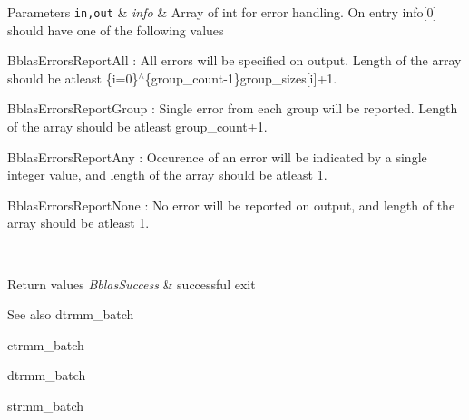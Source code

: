 \begin{DoxyParams}[1]{Parameters}
\hline
\mbox{\tt in,out}  & {\em info} & Array of int for error handling. On entry info\mbox{[}0\mbox{]} should have one of the following values
\begin{DoxyItemize}
\item Bblas\+Errors\+Report\+All \+: All errors will be specified on output. Length of the array should be atleast \{i=0\}$^\wedge$\{group\+\_\+count-\/1\}group\+\_\+sizes\mbox{[}i\mbox{]}+1.
\item Bblas\+Errors\+Report\+Group \+: Single error from each group will be reported. Length of the array should be atleast group\+\_\+count+1.
\item Bblas\+Errors\+Report\+Any \+: Occurence of an error will be indicated by a single integer value, and length of the array should be atleast 1.
\item Bblas\+Errors\+Report\+None \+: No error will be reported on output, and length of the array should be atleast 1.
\end{DoxyItemize}\\
\hline
\end{DoxyParams}

\begin{DoxyRetVals}{Return values}
{\em Bblas\+Success} & successful exit\\
\hline
\end{DoxyRetVals}
\begin{DoxySeeAlso}{See also}
dtrmm\+\_\+batch 

ctrmm\+\_\+batch 

dtrmm\+\_\+batch 

strmm\+\_\+batch 
\end{DoxySeeAlso}
\mbox{\label{group__trmm__batch_ga2c83d184ed54d501cdcc35bccdee8306}} 
